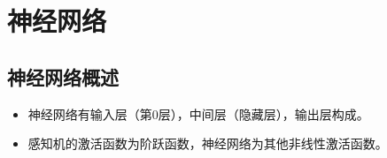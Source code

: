 \documentclass[letterpaper,10pt,english]{sphinxmanual}
\let\sphinxpxdimen\pdfpxdimen\else\newdimen\sphinxpxdimen
\begin{document}
%
\begin{sphinxVerbatim}[commandchars=\\\{\}]
  
           
           
           
         
\end{sphinxVerbatim}


\chapter{神经网络}
\label{\detokenize{_u795e_u7ecf_u7f51_u7edc:id1}}\label{\detokenize{_u795e_u7ecf_u7f51_u7edc::doc}}

\section{神经网络概述}
\label{\detokenize{_u795e_u7ecf_u7f51_u7edc:id2}}\begin{itemize}
\item {} 
\begin{quote}

\noindent\sphinxincludegraphics[width=400\sphinxpxdimen]{{net}.png}
\end{quote}

神经网络有输入层（第0层），中间层（隐藏层），输出层构成。

\begin{DUlineblock}{0em}
\item[] 
\end{DUlineblock}

\item {} 

感知机的激活函数为阶跃函数，神经网络为其他非线性激活函数。

\end{itemize}
\end{document}
